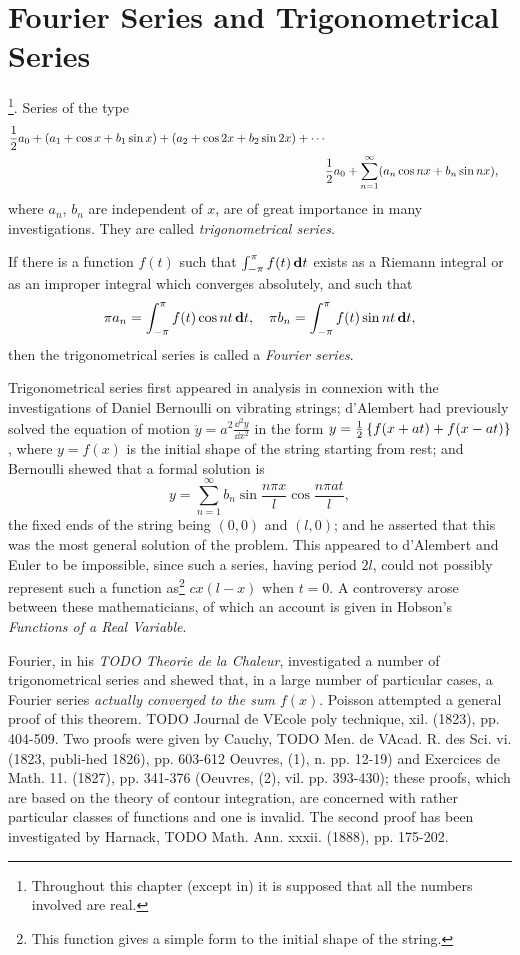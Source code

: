 %
%
\chapter{Fourier Series and Trigonometrical Series}
\footnote{Throughout
  this chapter (except in) it is supposed that all
  the numbers involved are real.}.
Series of the type
\begin{align*}
  \half a_{0}
  + (a_{1} + \cos x + b_{1} \sin x)
  + (a_{2} + \cos 2x + b_{2} \sin 2x)
  + \cdots
  \\
  &
  \hfill
  \half a_{0}
  +
  \sum_{n=1}^{\infty} ( a_{n} \cos nx + b_{n} \sin nx),
\end{align*}
where $a_{n}$, $b_{n}$ are independent of $x$, are of great importance in many
investigations. They are called \emph{trigonometrical series}.

If there is a function $f(t)$ such that
$\int_{-\pi}^{\pi} f(t) \, \mathbf{d} t$ exists as a Riemann
integral or as an improper integral which converges absolutely, and such that
$$
\pi a_{n} = \int_{-\pi}^{\pi} f(t) \cos nt \, \mathbf{d} t,
\quad
\pi b_{n} = \int_{-\pi}^{\pi} f(t) \sin nt \, \mathbf{d} t,
$$
then the trigonometrical series is called a \emph{Fourier series}.

Trigonometrical series first appeared in analysis in connexion with
the investigations of Daniel Bernoulli on vibrating
strings;
d'Alembert had previously solved the equation of
motion
$ \ddot{y} = a^{2} \frac{\dd^{2} y}{\dd x^{2}}$
in the form
$y = \frac{1}{2} \left\{ f(x+at) + f(x-at) \right\}$, where $y=f(x)$ is
the initial shape of the string starting from rest;
and Bernoulli shewed that a formal solution is
$$
y
=
\sum_{n=1}^{\infty}
b_{n}
\sin \frac{n \pi x}{l}
\cos \frac{n \pi a t}{l},
$$
the fixed ends of the string being $(0,0)$ and $(l,0)$; and he asserted
that this was the most general solution of the problem. This appeared
to d'Alembert and Euler to be impossible, since such a series, having
period $2l$, could not possibly represent such a function
as\footnote{This function gives a simple form to the initial shape of the string.}
$c x (l-x)$ when $t = 0$.
A controversy arose between these mathematicians, of which
an account is given in Hobson's \emph{Functions of a Real Variable}.

Fourier, in his \emph{TODO Theorie de la Chaleur}, investigated a number of
trigonometrical series and shewed that, in a large number of
particular cases, a Fourier series \emph{actually converged to the sum $f(x)$}.
Poisson attempted a general proof of this theorem. TODO Journal de VEcole
poly technique, xil. (1823), pp. 404-509. Two proofs were given by
Cauchy, TODO Men. de VAcad. R. des Sci. vi. (1823, publi-hed 1826), pp.
603-612 Oeuvres, (1), n. pp. 12-19) and Exercices de Math. 11. (1827),
pp. 341-376 (Oeuvres, (2), vil. pp. 393-430); these proofs, which are
based on the theory of contour integration, are concerned with rather
particular classes of functions and one is invalid. The second proof
has been investigated by Harnack, TODO Math. Ann. xxxii. (1888), pp.
175-202.

